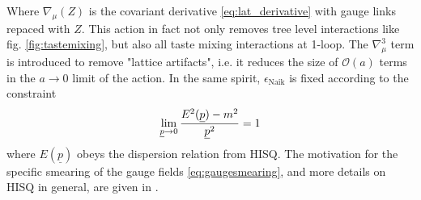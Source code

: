 Where $\nabla_{\mu}(Z)$ is the covariant derivative \eqref{eq:lat_derivative} with gauge links repaced with $Z$. This action in fact not only removes tree level interactions like fig. \ref{fig:tastemixing}, but also all taste mixing interactions at 1-loop. The $\nabla^3_{\mu}$ term is introduced to remove "lattice artifacts", i.e. it reduces the size of $\mathcal{O}(a)$ terms in the $a\to 0$ limit of the action. In the same spirit, $\epsilon_{\text{Naik}}$ is fixed according to the constraint
\begin{align}
	\lim_{\underline{p}\to 0} {E^2(\underline{p})-m^2\over \underline{p}^2} = 1
\end{align}
where $E(\underline{p})$ obeys the dispersion relation from HISQ. The motivation for the specific smearing of the gauge fields \eqref{eq:gaugesmearing}, and more details on HISQ in general, are given in \cite{Follana:2006rc}.